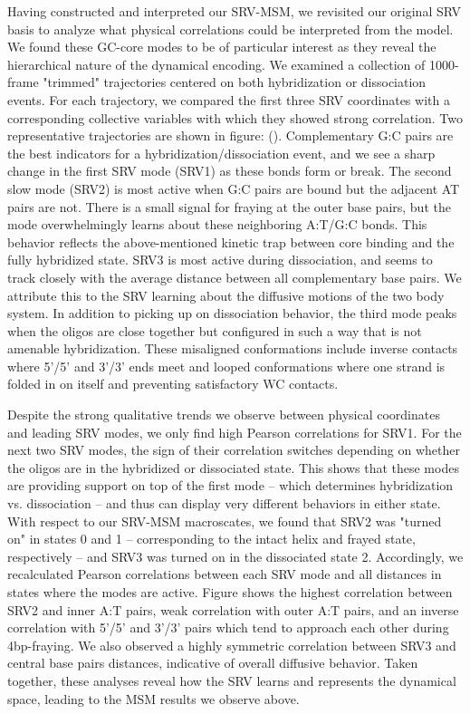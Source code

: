 \documentclass[journal=jpcbfk,manuscript=article]{achemso}
\begin{document}
Having constructed and interpreted our SRV-MSM, we revisited our original SRV basis to analyze what physical correlations could be interpreted from the model. We found these GC-core modes to be of particular interest as they reveal the hierarchical nature of the dynamical encoding. We examined a collection of 1000-frame "trimmed" trajectories centered on both hybridization or dissociation events. For each trajectory, we compared the first three SRV coordinates with a corresponding collective variables with which they showed strong correlation. Two representative trajectories are shown in figure: (\label{fig:GC-core_tracking_modes}). Complementary G:C pairs are the best indicators for a hybridization/dissociation event, and we see a sharp change in the first SRV mode (SRV1) as these bonds form or break. The second slow mode (SRV2) is most active when G:C pairs are bound but the adjacent AT pairs are not. There is a small signal for fraying at the outer base pairs, but the mode overwhelmingly learns about these neighboring A:T/G:C bonds. This behavior reflects the above-mentioned kinetic trap between core binding and the fully hybridized state. SRV3 is most active during dissociation, and seems to track closely with the average distance between all complementary base pairs. We attribute this to the SRV learning about the diffusive motions of the two body system. In addition to picking up on dissociation behavior, the third mode peaks when the oligos are close together but configured in such a way that is not amenable hybridization. These misaligned conformations include inverse contacts where 5'/5' and 3'/3' ends meet and looped conformations where one strand is folded in on itself and preventing satisfactory WC contacts. 

Despite the strong qualitative trends we observe between physical coordinates and leading SRV modes, we only find high Pearson correlations for SRV1. For the next two SRV modes, the sign of their correlation switches depending on whether the oligos are in the hybridized or dissociated state. This shows that these modes are providing support on top of the first mode -- which determines hybridization vs. dissociation -- and thus can display very different behaviors in either state. With respect to our SRV-MSM macroscates, we found that SRV2 was "turned on" in states 0 and 1 -- corresponding to the intact helix and frayed state, respectively -- and SRV3 was turned on in the dissociated state 2. Accordingly, we recalculated Pearson correlations between each SRV mode and all distances in states where the modes are active. Figure \label{fig:GC-core_srv_correlations} shows the highest correlation between SRV2 and inner A:T pairs, weak correlation with outer A:T pairs, and an inverse correlation with 5'/5' and 3'/3' pairs which tend to approach each other during 4bp-fraying. We also observed a highly symmetric correlation between SRV3 and central base pairs distances, indicative of overall diffusive behavior. Taken together, these analyses reveal how the SRV learns and represents the dynamical space, leading to the MSM results we observe above.
\end{document}
